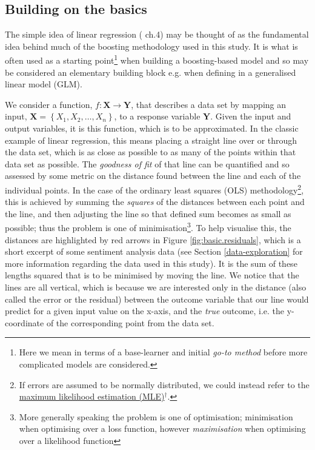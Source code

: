 \documentclass{article}
\begin{document}
\subsection{Building on the basics \label{linear-model}}
\label{sec-5-2}

The simple idea of linear regression (\cite{hyndman2014forecasting} ch.4) may be thought of as the fundamental idea behind much of the boosting methodology used in this study. It is what is often used as a starting point\footnote{Here we mean in terms of a base-learner and initial \emph{go-to method} before more complicated models are considered.} when building a boosting-based model and so may be considered an elementary building block e.g. when defining in a generalised linear model (GLM).

We consider a function, $f : \mathbf{X} \rightarrow \mathbf{Y}$, that describes a data set by mapping an input, $\mathbf{X} = \left\{ X_1, X_2, … , X_n \right\}$, to a response variable $\mathbf{Y}$. Given the input and output variables, it is this function, which is to be approximated. In the classic example of linear regression, this means placing a straight line over or through the data set, which is as close as possible to as many of the points within that data set as possible. The \emph{goodness of fit} of that line can be quantified and so assessed by some metric on the distance found between the line and each of the individual points. In the case of the ordinary least squares (OLS) methodology\footnote{If errors are assumed to be normally distributed, we could instead refer to the \href{https://en.wikipedia.org/wiki/Maximum_likelihood}{maximum likelihood estimation (MLE)$^{\dag{}}$}.}, this is achieved by summing the \emph{squares} of the distances between each point and the line, and then adjusting the line so that defined sum becomes as small as possible; thus the problem is one of minimisation\footnote{More generally speaking the problem is one of optimisation; minimisation when optimising over a loss function, however \emph{maximisation} when optimising over a likelihood function}. To help visualise this, the distances are highlighted by red arrows in Figure \ref{fig:basic.residuals}, which is a short excerpt of some sentiment analysis data (see Section \ref{data-exploration} for more information regarding the data used in this study). It is the sum of these lengths squared that is to be minimised by moving the line. We notice that the lines are all vertical, which is because we are interested only in the distance (also called the error or the residual) between the outcome variable that our line would predict for a given input value on the x-axis, and the \emph{true} outcome, i.e. the y-coordinate of the corresponding point from the data set.
\end{document}
